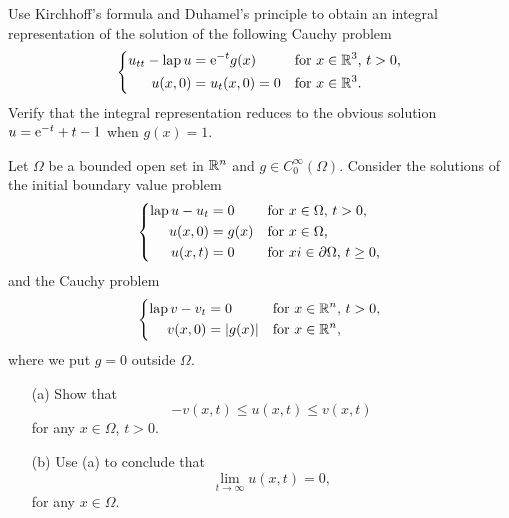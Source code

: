 \begin{problem}
  Use Kirchhoff's formula and Duhamel's principle to obtain an integral
  representation of the solution of the following Cauchy problem
  \[
    \left\{
      \begin{aligned}
        u_{tt}-\operatorname{lap} u&=\mathrm{e}^{-t} g(x)&&\text{for \(x\in\mathbb{R}^3\), \(t>0\),}\\
        u(x,0)&=u_t(x,0)=0&&\text{for \(x\in\mathbb{R}^3\).}
      \end{aligned}
    \right.
  \]
  Verify that the integral representation reduces to the obvious solution
  \(u=\mathrm{e}^{-t}+t-1\) when \(g(x)=1\).
\end{problem}
\begin{solution*}
\end{solution*}

\begin{problem}
  Let \(\Omega\) be a bounded open set in \(\mathbb{R}^n\) and \(g\in
  C_0^\infty(\Omega)\). Consider the solutions of the initial boundary
  value problem
  \[
    \left\{
      \begin{aligned}
        \operatorname{lap} u-u_t&=0&&\text{for \(x\in\Omega\), \(t>0\),}\\
        u(x,0)&=g(x)&&\text{for \(x\in\Omega\),}\\
        u(x,t)&=0&&\text{for \(xi\in\partial\Omega\), \(t\geq 0\),}
      \end{aligned}
    \right.
  \]
  and the Cauchy problem
  \[
    \left\{
      \begin{aligned}
        \operatorname{lap} v-v_t&=0&&\text{for \(x\in\mathbb{R}^n\), \(t>0\),}\\
        v(x,0)&=|g(x)|&&\text{for \(x\in\mathbb{R}^n\),}
      \end{aligned}
    \right.
  \]
  where we put \(g=0\) outside \(\Omega\).
  \begin{itemize}[noitemsep]
  \item[(a)] Show that
    \[
      -v(x,t)\leq u(x,t)\leq v(x,t)
    \]
    for any \(x\in\Omega\), \(t>0\).
  \item[(b)] Use (a) to conclude that
    \[
      \lim_{t\to\infty} u(x,t)=0,
    \]
    for any \(x\in\Omega\).
  \end{itemize}
\end{problem}
\begin{solution*}
\end{solution*}

